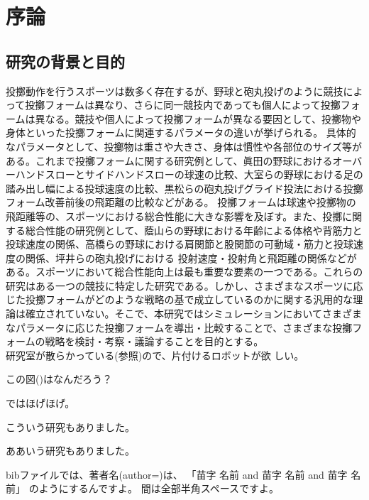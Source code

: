 \chapter[序論]%
        {序論}
        \section{研究の背景と目的}

        投擲動作を行うスポーツは数多く存在するが、野球と砲丸投げのように競技によって投擲フォームは異なり、さらに同一競技内であっても個人によって投擲フォームは異なる。競技や個人によって投擲フォームが異なる要因として、投擲物や身体といった投擲フォームに関連するパラメータの違いが挙げられる。
        具体的なパラメータとして、投擲物は重さや大きさ、身体は慣性や各部位のサイズ等がある。これまで投擲フォームに関する研究例として、眞田の野球におけるオーバーハンドスローとサイドハンドスローの球速の比較、大室らの野球における足の踏み出し幅による投球速度の比較、黒松らの砲丸投げグライド投法における投擲フォーム改善前後の飛距離の比較などがある。
        投擲フォームは球速や投擲物の飛距離等の、スポーツにおける総合性能に大きな影響を及ぼす。また、投擲に関する総合性能の研究例として、蔭山らの野球における年齢による体格や背筋力と投球速度の関係、高橋らの野球における肩関節と股関節の可動域・筋力と投球速度の関係、坪井らの砲丸投げにおける
        投射速度・投射角と飛距離の関係などがある。スポーツにおいて総合性能向上は最も重要な要素の一つである。これらの研究はある一つの競技に特定した研究である。しかし、さまざまなスポーツに応じた投擲フォームがどのような戦略の基で成立しているのかに関する汎用的な理論は確立されていない。そこで、本研究ではシミュレーションにおいてさまざまなパラメータに応じた投擲フォームを導出・比較することで、さまざまな投擲フォームの戦略を検討・考察・議論することを目的とする。\\
        研究室が散らかっている(参照)ので、片付けるロボットが欲
        しい。

        この図()はなんだろう？

        ではほげほげ。

        こういう研究\cite{Ikuo:doctor}もありました。

        ああいう研究\cite{Hondo:JRSJ2011}もありました。

        bibファイルでは、著者名(author=)は、
        「苗字 名前 and 苗字 名前 and 苗字 名前」
        のようにするんですよ\cite{Mizuuchi:RSJ2015-baneoid}。
        間は全部半角スペースですよ。

